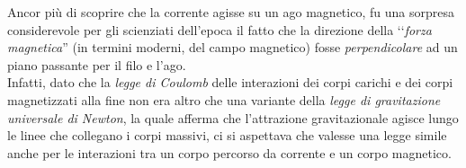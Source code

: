 \begin{digression}
	Ancor più di scoprire che la corrente agisse su un ago magnetico, fu una sorpresa considerevole per gli scienziati dell'epoca il fatto che la direzione della ‘‘\textit{forza magnetica}'' (in termini moderni, del campo magnetico) fosse \textit{perpendicolare} ad un piano passante per il filo e l'ago.\\
	Infatti, dato che la \textit{legge di Coulomb} delle interazioni dei corpi carichi e dei corpi magnetizzati alla fine non era altro che una variante della \textit{legge di gravitazione universale di Newton}, la quale afferma che l'attrazione gravitazionale agisce lungo le linee che collegano i corpi massivi, ci si aspettava che valesse una legge simile anche per le interazioni tra un corpo percorso da corrente e un corpo magnetico.
\end{digression}
